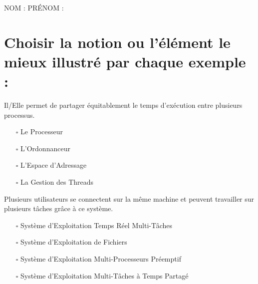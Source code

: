 \documentclass[11pt,a4paper]{article}
\author{Fabrice BOISSIER}
\newcommand{\CaseCoche}{\fontsize{20}{20}\selectfont $ \square $}
\begin{document}
\setlength{\fboxrule}{2pt}

\noindent {}

\bigskip

NOM : \hspace{6.5cm} PR\'ENOM :

\smallskip

\section{Choisir la notion ou l'élément le mieux illustré par chaque exemple : }

\medskip
\noindent Il/Elle permet de partager équitablement le temps d'exécution entre plusieurs processus.\\

\begin{itemize}
\item[\CaseCoche] Le Processeur\\
\item[\CaseCoche] L'Ordonnanceur\\
\item[\CaseCoche] L'Espace d'Adressage\\
\item[\CaseCoche] La Gestion des Threads\\
\end{itemize}

\bigskip
\noindent Plusieurs utilisateurs se connectent sur la même machine et peuvent travailler sur plusieurs tâches grâce à ce système.\\

\begin{itemize}
\item[\CaseCoche] Système d'Exploitation Temps Réel Multi-Tâches\\
\item[\CaseCoche] Système d'Exploitation de Fichiers\\
\item[\CaseCoche] Système d'Exploitation Multi-Processeurs Préemptif\\
\item[\CaseCoche] Système d'Exploitation Multi-Tâches à Temps Partagé\\
\end{itemize}
\end{document}
